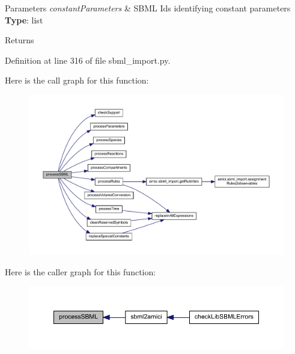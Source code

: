 \begin{DoxyParams}{Parameters}
{\em constant\+Parameters} & S\+B\+ML Ids identifying constant parameters ~\newline
{\bfseries Type}\+: list\\
\hline
\end{DoxyParams}
\begin{DoxyReturn}{Returns}

\end{DoxyReturn}


Definition at line 316 of file sbml\+\_\+import.\+py.

Here is the call graph for this function\+:
\nopagebreak
\begin{figure}[H]
\begin{center}
\leavevmode
\includegraphics[width=350pt]{classamici_1_1sbml__import_1_1_sbml_importer_ac188693ab1d9fc500d55748dbde9bf89_cgraph}
\end{center}
\end{figure}
Here is the caller graph for this function\+:
\nopagebreak
\begin{figure}[H]
\begin{center}
\leavevmode
\includegraphics[width=350pt]{classamici_1_1sbml__import_1_1_sbml_importer_ac188693ab1d9fc500d55748dbde9bf89_icgraph}
\end{center}
\end{figure}
\mbox{\label{classamici_1_1sbml__import_1_1_sbml_importer_ae9585f937c02f0618abeb06dd48bcd54}} 
